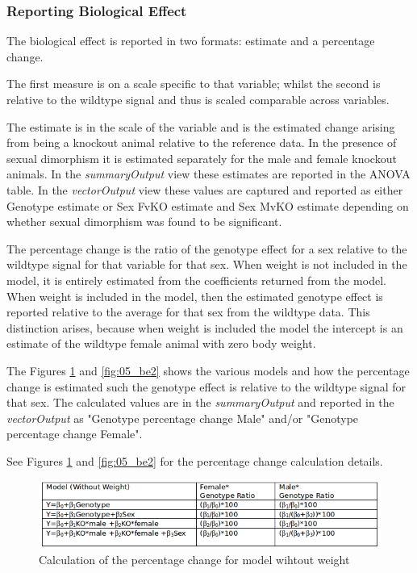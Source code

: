 \documentclass[12pt,a4paper]{article}
\begin{document}
\subsubsection{Reporting Biological Effect}
\label{section:BiologicalEffect}
The biological effect is reported in two formats: estimate and a percentage change. 

The first measure is on a scale specific to that variable; whilst the second is relative to the wildtype signal and thus is scaled comparable across variables. 

The estimate is in the scale of the variable and is the estimated change arising from being a knockout animal relative to the reference data. In the presence of sexual dimorphism it is estimated separately for the male and female knockout animals. In the \textit{summaryOutput} view these estimates are reported in the ANOVA table. In the \textit{vectorOutput} view these values are captured and reported as either Genotype estimate or Sex FvKO estimate and Sex MvKO estimate depending on whether sexual dimorphism was found to be significant.

The percentage change is the ratio of the genotype effect for a sex relative to the wildtype signal for that variable for that sex. When weight is not included in the model, it is entirely estimated from the coefficients returned from the model. When weight is included in the model, then the estimated genotype effect is reported relative to the average for that sex from the wildtype data. This distinction arises, because when weight is included the model the intercept is an estimate of the wildtype female animal with zero body weight.

The Figures \ref{fig:05_be1} and \ref{fig:05_be2} shows the various models and how the percentage change is estimated such the genotype effect is relative to the wildtype signal for that sex. The calculated values are in the \textit{summaryOutput} and reported in the \textit{vectorOutput} as "Genotype percentage change Male" and/or "Genotype percentage change Female".  

See Figures \ref{fig:05_be1} and \ref{fig:05_be2} for the percentage change calculation details.

\begin{figure}[!htpb]%
\centerline{\includegraphics[scale=0.6]{BiologicalEffect1.png}}
\caption{Calculation of the percentage change for model wihtout weight}\label{fig:05_be1}
\end{figure}
\end{document}
